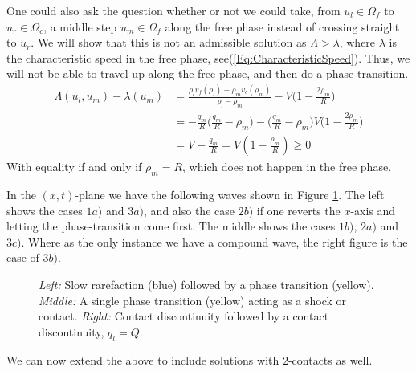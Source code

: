 \documentclass[10pt]{article}
\numberwithin{equation}{section}
\begin{document}
 One could also ask the question whether or not we could take, from $u_l \in \Omega_f$ to $u_r \in \Omega_c$, a middle step $u_m \in \Omega_f$ along the free phase instead of crossing straight to $u_r$. We will show that this is not an admissible solution as $\Lambda > \lambda$, where $\lambda$ is the characteristic speed in the free phase, see(\ref{Eq:CharacteristicSpeed}). Thus, we will not be able to travel up along the free phase, and then do a phase transition. 
 \begin{align*}
      \Lambda(u_l,u_m) - \lambda(u_m) &= \frac{\rho_l v_f(\rho_l) - \rho_m v_c(\rho_m)}{\rho_l - \rho_m} - V \bigg(1-  \frac{2\rho_m}{R} \bigg) \\
      &= - \frac{q_m}{R} \bigg( \frac{q_m}{R} - \rho_m \bigg) - \bigg( \frac{q_m}{R} - \rho_m \bigg)V \bigg(1- \frac{2\rho_m}{R} \bigg) \\
      &= V - \frac{q_m}{R} = V( 1- \frac{\rho_m}{R}) \geq 0 
 \end{align*}
With equality if and only if $\rho_m = R$, which does not happen in the free phase. 


In the $(x,t)$-plane we have the following waves shown in Figure \ref{fig:PhTSolInXT}. The left shows the cases $1a)$ and $3a)$, and also the case $2b)$ if one reverts the $x$-axis and letting the phase-transition come first. The middle shows the cases $1b)$, $2a)$ and $ 3c)$. Where as the only instance we have a compound wave, the right figure is the case of $3b)$. 
\begin{figure}
    \centering
    
    \caption{\textit{Left:} Slow rarefaction (blue) followed by a phase transition (yellow). \textit{Middle:} A single phase transition (yellow) acting as a shock or contact. \textit{Right:} Contact discontinuity followed by a contact discontinuity, $q_l = Q$.}
    \label{fig:PhTSolInXT}
\end{figure}

We can now extend the above to include solutions with $2$-contacts as well. 
\end{document}
